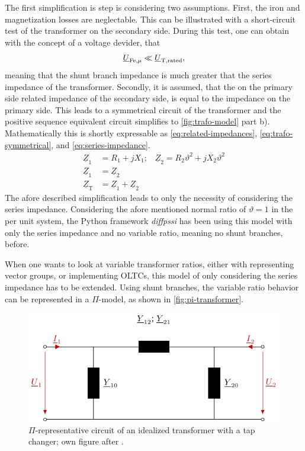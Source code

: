 The first simplification is step is considering two assumptions. 
First, the iron and magnetization losses are neglectable. 
This can be illustrated with a short-circuit test of the transformer on the secondary side. 
During this test, one can obtain with the concept of a voltage devider, that
\begin{align}
    \underline{U}_\mathrm{Fe, \mu} \ll \underline{U}_\mathrm{T,rated}, \notag
\end{align}
meaning that the shunt branch impedance is much greater that the series impedance of the transformer. 
Secondly, it is assumed, that the on the primary side related impedance of the secondary side, is equal to the impedance on the primary side. 
This leads to a symmetrical circuit of the transformer and the positive sequence equivalent circuit simplifies to \autoref{fig:trafo-model} part b). 
Mathematically this is shortly expressable as \autoref{eq:related-impedances}, \autoref{eq:trafo-symmetrical}, and \autoref{eq:series-impedance}. \autocite{machowski_2020,kundur_2022,milano_2010}
\begin{align}
    \underline{Z}_1 &= R_1 + jX_1\text{;}\quad\underline{Z}_2 = R_2 \vartheta^2 + jX_2 \vartheta^2 \label{eq:related-impedances} \\
    \underline{Z}_1 &= \underline{Z}_2 \label{eq:trafo-symmetrical} \\
    \underline{Z}_\mathrm{T} &= \underline{Z}_1 + \underline{Z}_2 \label{eq:series-impedance}
\end{align}
The afore described simplification leads to only the necessity of considering the series impedance. 
Considering the afore mentioned normal ratio of $\vartheta=1$ in the per unit system, the Python framework \textit{diffpssi} has been using this model with only the series impedance and no variable ratio, meaning no shunt branches, before.

When one wants to look at variable transformer ratios, either with representing vector groups, or implementing \acfp{OLTC}, this model of only considering the series impedance has to be extended. 
Using shunt branches, the variable ratio behavior can be represented in a $\Pi$-model, as shown in \autoref{fig:pi-transformer}. \autocite{machowski_2020,kundur_2022,milano_2010}

\begin{figure}%
    \centering
    \includegraphics[width=.7\textwidth]{tikz_graphics/images/transformer_pi.pdf}
    \caption[$\Pi$-representative circuit of an idealized transformer with a tap changer]{$\Pi$-representative circuit of an idealized transformer with a tap changer; own figure after \autocite{milano_2010,burlakin_2024}.}
    \label{fig:pi-transformer}
\end{figure}


